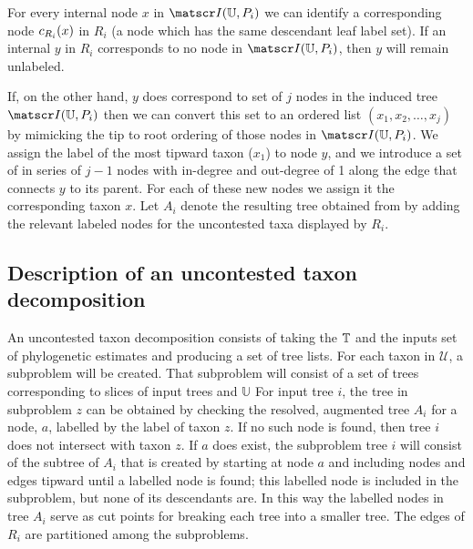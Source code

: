 \documentclass[11pt]{article}
\newcommand{\uncontestedTaxa}{\ensuremath{\mathcal{U}}\xspace}
\begin{document}
For every internal node $x$ in $\induced{\mathbb{U}}{P_i}$ we can identify a 
    corresponding node $\corresponding{x}{R_i}$ in $R_i$ (a node which has
    the same descendant leaf label set).
If an internal $y$ in $R_i$ corresponds to no node in $\induced{\mathbb{U}}{P_i}$,
    then $y$ will remain unlabeled.

If, on the other hand, $y$ does correspond to set of $j$ nodes 
    in the induced tree $\induced{\mathbb{U}}{P_i}$ 
    then we can convert this set to an ordered list $(x_1, x_2,\ldots, x_j)$ by mimicking the 
    tip to root ordering of those nodes in $\induced{\mathbb{U}}{P_i}$.
We assign the label of the most tipward taxon ($x_1$) to node $y$, and
    we introduce a set of in series of $j-1$ nodes with in-degree and out-degree of 1
    along the edge that connects $y$ to its parent.
For each of these new nodes we assign it the corresponding taxon $x$.
Let $A_i$ denote the resulting tree obtained from by adding the
    relevant labeled nodes for the uncontested taxa displayed by $R_i$.

\subsection{Description of an uncontested taxon decomposition}
An uncontested taxon decomposition consists of taking the $\taxonomy$
    and the inputs set of phylogenetic estimates and producing a set of 
    tree lists.
For each taxon in $\uncontestedTaxa$, a subproblem will be created.
That subproblem will consist of a set of trees corresponding to slices of input trees
    and $\mathbb{U}$
For input tree $i$, the tree in subproblem $z$ can be obtained by checking
    the resolved, augmented tree $A_i$ for a node, $a$, labelled by the label of taxon $z$.
If no such node is found, then tree $i$ does not intersect with taxon $z$.
If $a$ does exist, the subproblem tree $i$ will consist of the subtree of $A_i$ that
    is created by starting at node $a$ and including nodes and edges tipward until
    a labelled node is found; this labelled node is included in the subproblem, but
    none of its descendants are.
In this way the labelled nodes in tree $A_i$ serve as cut points for breaking each 
    tree into a smaller tree.
The edges of $R_i$ are partitioned among the subproblems.


\end{document}

